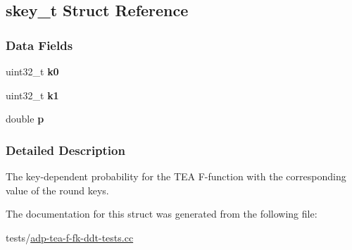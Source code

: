 \hypertarget{structskey__t}{\subsection{skey\-\_\-t \-Struct \-Reference}
\label{structskey__t}
}
\subsubsection*{\-Data \-Fields}
\begin{DoxyCompactItemize}
\item 
\hypertarget{structskey__t_adb7bc848b094612d2fad56704faa4032}{uint32\-\_\-t {\bfseries k0}}\label{structskey__t_adb7bc848b094612d2fad56704faa4032}

\item 
\hypertarget{structskey__t_aeed2887f4ef562c27c449f5aa17484ca}{uint32\-\_\-t {\bfseries k1}}\label{structskey__t_aeed2887f4ef562c27c449f5aa17484ca}

\item 
\hypertarget{structskey__t_a745a32c063c55e49984feb63cc7ece53}{double {\bfseries p}}\label{structskey__t_a745a32c063c55e49984feb63cc7ece53}

\end{DoxyCompactItemize}


\subsubsection{\-Detailed \-Description}
\-The key-\/dependent probability for the \-T\-E\-A \-F-\/function with the corresponding value of the round keys. 

\-The documentation for this struct was generated from the following file\-:\begin{DoxyCompactItemize}
\item 
tests/\hyperlink{adp-tea-f-fk-ddt-tests_8cc}{adp-\/tea-\/f-\/fk-\/ddt-\/tests.\-cc}\end{DoxyCompactItemize}
